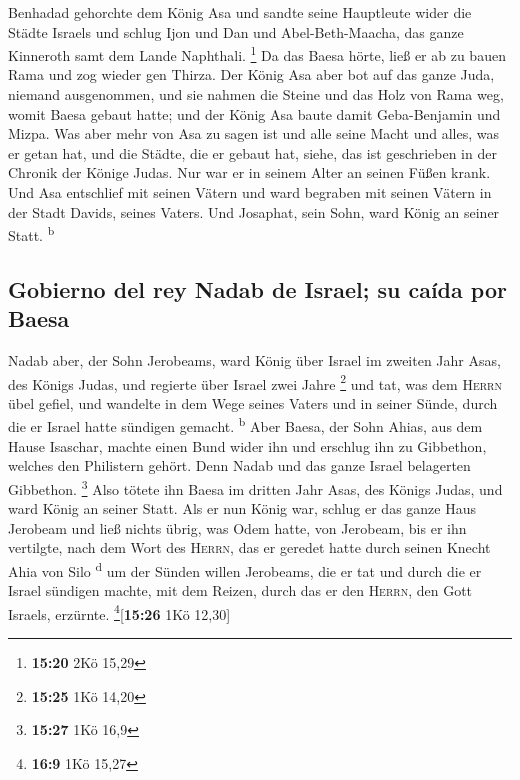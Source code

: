  Benhadad gehorchte dem König Asa und sandte seine
Hauptleute wider die Städte Israels und schlug Ijon und Dan und
Abel-Beth-Maacha, das ganze Kinneroth samt dem Lande Naphthali.
\footnote{\textbf{15:20} 2Kö 15,29}  Da das Baesa hörte,
ließ er ab zu bauen Rama und zog wieder gen Thirza.  Der
König Asa aber bot auf das ganze Juda, niemand ausgenommen, und sie
nahmen die Steine und das Holz von Rama weg, womit Baesa gebaut hatte;
und der König Asa baute damit Geba-Benjamin und Mizpa. 
Was aber mehr von Asa zu sagen ist und alle seine Macht und alles, was
er getan hat, und die Städte, die er gebaut hat, siehe, das ist
geschrieben in der Chronik der Könige Judas. Nur war er in seinem Alter
an seinen Füßen krank.  Und Asa entschlief mit seinen
Vätern und ward begraben mit seinen Vätern in der Stadt Davids, seines
Vaters. Und Josaphat, sein Sohn, ward König an seiner Statt.
\textsuperscript{b}

\hypertarget{gobierno-del-rey-nadab-de-israel-su-cauxedda-por-baesa}{%
\subsection{Gobierno del rey Nadab de Israel; su caída por
Baesa}\label{gobierno-del-rey-nadab-de-israel-su-cauxedda-por-baesa}}

 Nadab aber, der Sohn Jerobeams, ward König über Israel
im zweiten Jahr Asas, des Königs Judas, und regierte über Israel zwei
Jahre \footnote{\textbf{15:25} 1Kö 14,20}  und tat, was
dem \textsc{Herrn} übel gefiel, und wandelte in dem Wege seines Vaters
und in seiner Sünde, durch die er Israel hatte sündigen gemacht.
\textsuperscript{b}  Aber Baesa, der Sohn Ahias, aus dem
Hause Isaschar, machte einen Bund wider ihn und erschlug ihn zu
Gibbethon, welches den Philistern gehört. Denn Nadab und das ganze
Israel belagerten Gibbethon. \footnote{\textbf{15:27} 1Kö 16,9}
 Also tötete ihn Baesa im dritten Jahr Asas, des Königs
Judas, und ward König an seiner Statt.  Als er nun König
war, schlug er das ganze Haus Jerobeam und ließ nichts übrig, was Odem
hatte, von Jerobeam, bis er ihn vertilgte, nach dem Wort des
\textsc{Herrn}, das er geredet hatte durch seinen Knecht Ahia von Silo
\textsuperscript{d}  um der Sünden willen Jerobeams, die
er tat und durch die er Israel sündigen machte, mit dem Reizen, durch
das er den \textsc{Herrn}, den Gott Israels, erzürnte.
\footnote{\textbf{16:9} 1Kö 15,27}{[}\textbf{15:26} 1Kö 12,30{]}

